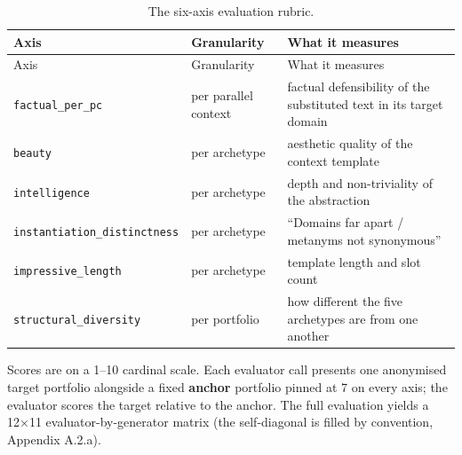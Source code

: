 \begin{longtable}[]{@{}
  >{\raggedright\arraybackslash}p{}
  >{\raggedright\arraybackslash}p{}
  >{\raggedright\arraybackslash}p{}@{}}
\caption{The six-axis evaluation rubric.}\tabularnewline
\toprule\noalign{}
\begin{minipage}[b]{\linewidth}\raggedright
Axis
\end{minipage} & \begin{minipage}[b]{\linewidth}\raggedright
Granularity
\end{minipage} & \begin{minipage}[b]{\linewidth}\raggedright
What it measures
\end{minipage} \\
\midrule\noalign{}
\endfirsthead
\toprule\noalign{}
\begin{minipage}[b]{\linewidth}\raggedright
Axis
\end{minipage} & \begin{minipage}[b]{\linewidth}\raggedright
Granularity
\end{minipage} & \begin{minipage}[b]{\linewidth}\raggedright
What it measures
\end{minipage} \\
\midrule\noalign{}
\endhead
\bottomrule\noalign{}
\endlastfoot
\texttt{factual\_per\_pc} & per parallel context & factual defensibility of the substituted text in its target domain \\
\texttt{beauty} & per archetype & aesthetic quality of the context template \\
\texttt{intelligence} & per archetype & depth and non-triviality of the abstraction \\
\texttt{instantiation\_distinctness} & per archetype & ``Domains far apart / metanyms not synonymous'' \\
\texttt{impressive\_length} & per archetype & template length and slot count \\
\texttt{structural\_diversity} & per portfolio & how different the five archetypes are from one another \\
\end{longtable}

Scores are on a 1--10 cardinal scale. Each evaluator call presents one anonymised target portfolio alongside a fixed \textbf{anchor} portfolio pinned at 7 on every axis; the evaluator scores the target relative to the anchor. The full evaluation yields a 12×11 evaluator-by-generator matrix (the self-diagonal is filled by convention, Appendix A.2.a).

